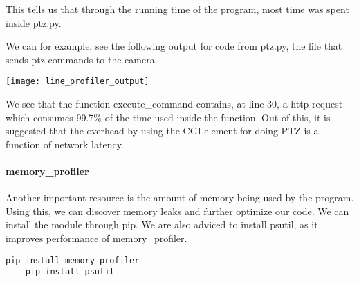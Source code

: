 This tells us that through the running time of the program, most time was spent inside ptz.py.

We can for example, see the following output for code from ptz.py, the file that sends ptz commands to the camera.

\texttt{[image: line\_profiler\_output]}

We see that the function execute\_command contains, at line 30, a http request which consumes 99.7\% of the time used inside the function. Out of this, it is suggested that the overhead by using the CGI element for doing PTZ is a function of network latency.

\paragraph{memory\_profiler}
Another important resource is the amount of memory being used by the program. Using this, we can discover memory leaks and further optimize our code. We can install the module through pip. We are also adviced to install psutil, as it improves performance of memory\_profiler.

\begin{lstlisting}[style=BashInputStyle]
    pip install memory_profiler
    pip install psutil
\end{lstlisting}